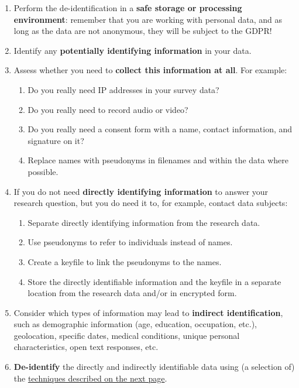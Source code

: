 \documentclass[
]{book}
\providecommand{\tightlist}{%
  \setlength{\itemsep}{0pt}\setlength{\parskip}{0pt}}
\begin{document}
\begin{enumerate}
\def\labelenumi{\arabic{enumi}.}
\tightlist
\item
  Perform the de-identification in a \textbf{safe storage or processing environment}:
  remember that you are working with personal data, and as long as the data are
  not anonymous, they will be subject to the GDPR!
\item
  Identify any \textbf{potentially identifying information} in your data.
\item
  Assess whether you need to \textbf{collect this information at all}. For example:

  \begin{enumerate}
  \def\labelenumii{\alph{enumii}.}
  \tightlist
  \item
    Do you really need IP addresses in your survey data?
  \item
    Do you really need to record audio or video?
  \item
    Do you really need a consent form with a name, contact information, and
    signature on it?
  \item
    Replace names with pseudonyms in filenames and within the data where
    possible.
  \end{enumerate}
\item
  If you do not need \textbf{directly identifying information} to answer your research
  question, but you do need it to, for example, contact data subjects:

  \begin{enumerate}
  \def\labelenumii{\alph{enumii}.}
  \tightlist
  \item
    Separate directly identifying information from the research data.
  \item
    Use pseudonyms to refer to individuals instead of names.
  \item
    Create a keyfile to link the pseudonyms to the names.
  \item
    Store the directly identifiable information and the keyfile in a separate
    location from the research data and/or in encrypted form.
  \end{enumerate}
\item
  Consider which types of information may lead to \textbf{indirect identification}, such
  as demographic information (age, education, occupation, etc.), geolocation,
  specific dates, medical conditions, unique personal characteristics, open text
  responses, etc.
\item
  \textbf{De-identify} the directly and indirectly identifiable data using (a selection
  of) the \protect\hyperlink{deidentification-techniques}{techniques described on the next page}.


\end{enumerate}
\end{document}
